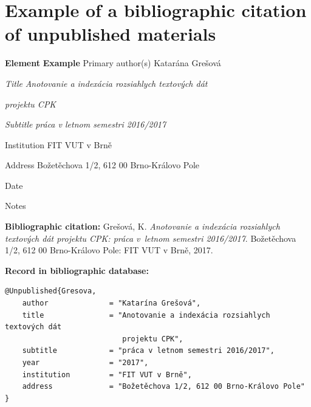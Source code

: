 \newpage
\section*{Example of a bibliographic citation of unpublished materials}
\label{pr-nepublikovane}
\begin{tabbing}
\zarazky
\textbf{Element} \> \textbf{Example} \odradkovani
Primary author(s) \>
Katarána {\sc Grešová}

\odradkovani
{\em Title} \>
{\em Anotovanie a indexácia rozsiahlych textových dát}

    \odradkovani \>
    {\em projektu CPK}

\odradkovani    
{\em Subtitle}\footnotemark[1] \>
{\em práca v letnom semestri 2016/2017}

\odradkovani
Institution \>
FIT VUT v Brně

\odradkovani
Address \>
Božetěchova 1/2, 612 00 Brno-Královo Pole

\odradkovani
Date 

\odradkovani
Notes\footnotemark[2] \>

\odradkovani
\end{tabbing}

\noindent \textbf{Bibliographic citation:} \odradkovani
{\sc Grešová}, K. {\em Anotovanie a indexácia rozsiahlych textových dát projektu CPK: práca v~letnom semestri 2016/2017}. Božetěchova 1/2, 612 00 Brno-Královo Pole: FIT VUT
v Brně, 2017.

\bigskip \bigskip
\noindent \textbf{Record in bibliographic database:}
\vspace{-0.5em}
\begin{verbatim}
@Unpublished{Gresova,
    author              = "Katarína Grešová",
    title               = "Anotovanie a indexácia rozsiahlych textových dát 
                           projektu CPK",
    subtitle            = "práca v letnom semestri 2016/2017",
    year                = "2017",
    institution         = "FIT VUT v Brně",
    address             = "Božetěchova 1/2, 612 00 Brno-Královo Pole"
}
\end{verbatim}


\newpage
